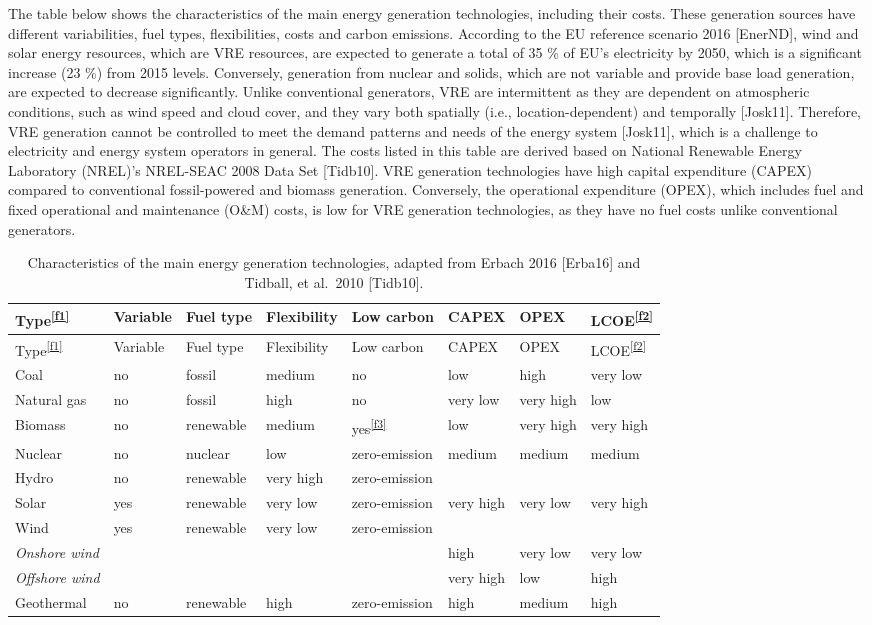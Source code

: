 The table below shows the characteristics of the main energy generation
technologies, including their costs. These generation sources have
different variabilities, fuel types, flexibilities, costs and carbon
emissions. According to the EU reference scenario 2016 {[}EnerND{]},
wind and solar energy resources, which are VRE resources, are expected
to generate a total of 35 \% of EU's electricity by 2050, which is a
significant increase (23 \%) from 2015 levels. Conversely, generation
from nuclear and solids, which are not variable and provide base load
generation, are expected to decrease significantly. Unlike conventional
generators, VRE are intermittent as they are dependent on atmospheric
conditions, such as wind speed and cloud cover, and they vary both
spatially (i.e., location-dependent) and temporally {[}Josk11{]}.
Therefore, VRE generation cannot be controlled to meet the demand
patterns and needs of the energy system {[}Josk11{]}, which is a
challenge to electricity and energy system operators in general. The
costs listed in this table are derived based on National Renewable
Energy Laboratory (NREL)'s NREL-SEAC 2008 Data Set {[}Tidb10{]}. VRE
generation technologies have high capital expenditure (CAPEX) compared
to conventional fossil-powered and biomass generation. Conversely, the
operational expenditure (OPEX), which includes fuel and fixed
operational and maintenance (O\&M) costs, is low for VRE generation
technologies, as they have no fuel costs unlike conventional generators.

\begin{longtable}[]{@{}llllllll@{}}
\caption{Characteristics of the main energy generation technologies,
adapted from Erbach 2016 {[}Erba16{]} and Tidball, et al.~2010
{[}Tidb10{]}.}\tabularnewline
\toprule
Type\textsuperscript{\protect\hyperlink{f1}{{[}f1{]}}} & Variable & Fuel
type & Flexibility & Low carbon & CAPEX & OPEX &
LCOE\textsuperscript{\protect\hyperlink{f2}{{[}f2{]}}}\tabularnewline
\midrule
\endfirsthead
\toprule
Type\textsuperscript{\protect\hyperlink{f1}{{[}f1{]}}} & Variable & Fuel
type & Flexibility & Low carbon & CAPEX & OPEX &
LCOE\textsuperscript{\protect\hyperlink{f2}{{[}f2{]}}}\tabularnewline
\midrule
\endhead
Coal & no & fossil & medium & no & low & high & very low\tabularnewline
Natural gas & no & fossil & high & no & very low & very high &
low\tabularnewline
Biomass & no & renewable & medium &
yes\textsuperscript{\protect\hyperlink{f3}{{[}f3{]}}} & low & very high
& very high\tabularnewline
Nuclear & no & nuclear & low & zero-emission & medium & medium &
medium\tabularnewline
Hydro & no & renewable & very high & zero-emission & & &\tabularnewline
Solar & yes & renewable & very low & zero-emission & very high & very
low & very high\tabularnewline
Wind & yes & renewable & very low & zero-emission & & &\tabularnewline
\emph{Onshore wind} & & & & & high & very low & very low\tabularnewline
\emph{Offshore wind} & & & & & very high & low & high\tabularnewline
Geothermal & no & renewable & high & zero-emission & high & medium &
high\tabularnewline
\bottomrule
\end{longtable}

